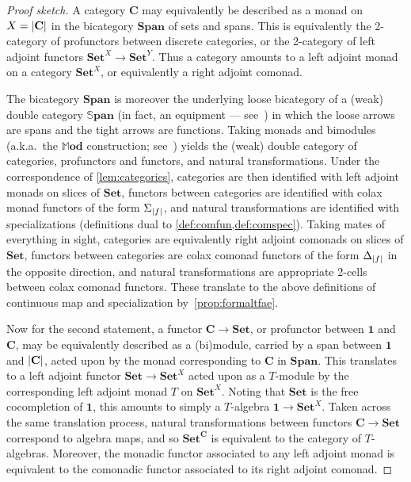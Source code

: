 \documentclass[11pt, oneside, article]{memoir}
\theoremstyle{plain}
\theoremstyle{definition}
\theoremstyle{remark}
\DeclarePairedDelimiter{\abs}{\lvert}{\rvert}
\newcommand{\namedcat}[1]{\mathbf{#1}}
\newcommand{\cat}[1]{\mathbf{#1}}
\newcommand{\Set}{\namedcat{Set}}
\newcommand{\Span}{\namedcat{Span}}
\newcommand{\SSpan}{\mathbb{S}\namedcat{pan}}
\newcommand{\MMod}{\mathbb{M}\namedcat{od}}
\newcommand{\pts}[1]{{\abs{#1}}}
\newcommand{\obs}[1]{\pts{#1}}
\newcommand{\one}[1]{\pts{#1}}
\newcommand{\leindex}[1]{\Sigma_{#1}}
\newcommand{\reindex}[1]{\Delta_{#1}}
\newcommand{\point}{\mathbf{1}}
\newcommand{\fun}[2]{{#2}^{#1}}
\newcommand{\xT}{T}
\newcommand{\xX}{X}
\newcommand{\xY}{Y}
\newcommand{\bC}{\cat{C}}
\begin{document}
\begin{proof}[Proof sketch]
  A category $\bC$ may equivalently be described as a monad on
  $\xX = \obs{\bC}$ in the bicategory $\Span$ of sets and spans. This
  is equivalently the 2-category of profunctors between discrete
  categories, or the 2-category of left adjoint functors
  $\Set^\xX \to \Set^\xY$. Thus a category amounts to a left adjoint
  monad on a category $\Set^\xX$, or equivalently a right adjoint
  comonad.

  The bicategory $\Span$ is moreover the underlying loose bicategory
  of a (weak) double category $\SSpan$ (in fact, an equipment ---
  see~\cite{cruttwell-shulman}) in which the loose arrows are spans
  and the tight arrows are functions. Taking monads and bimodules
  (a.k.a.\ the $\MMod$ construction;
  see~\cite{wood:ii,leinster:enrichment,cruttwell-shulman}) yields the
  (weak) double category of categories, profunctors and functors, and
  natural transformations. Under the correspondence of
  \cref{lem:categories}, categories are then identified with left
  adjoint monads on slices of $\Set$, functors between categories are
  identified with colax monad functors of the form
  $\leindex{\one{f}}$, and natural transformations are identified with
  specializations (definitions dual to
  \cref{def:comfun,def:comspec}). Taking mates of everything in sight,
  categories are equivalently right adjoint comonads on slices of
  $\Set$, functors between categories are colax comonad functors of
  the form $\reindex{\one{f}}$ in the opposite direction, and natural
  transformations are appropriate 2-cells between colax comonad
  functors. These translate to the above definitions of continuous map
  and specialization by~\cref{prop:formaltfae}.

  Now for the second statement, a functor $\bC \to \Set$, or
  profunctor between $\point$ and $\bC$, may be equivalently described
  as a (bi)module, carried by a span between $\point$ and $\obs{\bC}$,
  acted upon by the monad corresponding to $\bC$ in
  $\Span$. This translates to a left adjoint
  functor $\Set \to \Set^\xX$ acted upon as a $\xT$-module by the
  corresponding left adjoint monad $\xT$ on $\Set^\xX$. Noting that
  $\Set$ is the free cocompletion of $\point$, this amounts to simply
  a $\xT$-algebra $\point \to \Set^\xX$. Taken across the same
  translation process, natural transformations between functors
  $\bC\to \Set$ correspond to algebra maps, and so $\fun{\bC}{\Set}$
  is equivalent to the category of $\xT$-algebras. Moreover, the
  monadic functor associated to any left adjoint monad is equivalent
  to the comonadic functor associated to its right adjoint comonad.
\end{proof}
\end{document}

